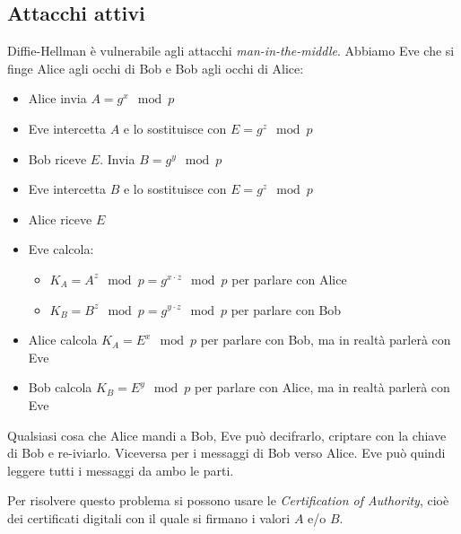 \subsection{Attacchi attivi}
Diffie-Hellman è vulnerabile agli attacchi \emph{man-in-the-middle}. Abbiamo Eve che si finge Alice agli occhi di Bob e Bob agli occhi di Alice:
\begin{itemize}
    \item Alice invia $ A = g^x \mod p$
    \item Eve intercetta $A$ e lo sostituisce con $E = g^z \mod p$
    \item Bob riceve $E$. Invia $ B = g^y \mod p $
    \item Eve intercetta $B$ e lo sostituisce con $E = g^z \mod p$
    \item Alice riceve $E$
    \item Eve calcola:
    \begin{itemize}
        \item $K_A = A^z \mod p = g^{x \cdot z} \mod p$ per parlare con Alice
        \item $K_B = B^z \mod p = g^{y \cdot z} \mod p$ per parlare con Bob
    \end{itemize}
    \item Alice calcola $K_A = E^x \mod p$ per parlare con Bob, ma in realtà parlerà con Eve
    \item Bob calcola $K_B = E^y \mod p$ per parlare con Alice, ma in realtà parlerà con Eve
\end{itemize}

Qualsiasi cosa che Alice mandi a Bob, Eve può decifrarlo, criptare con la chiave di Bob e re-iviarlo.
Viceversa per i messaggi di Bob verso Alice.
Eve può quindi leggere tutti i messaggi da ambo le parti.

Per risolvere questo problema si possono usare le \emph{Certification of Authority}, cioè dei certificati digitali con il quale si firmano i valori $A$ e/o $B$.